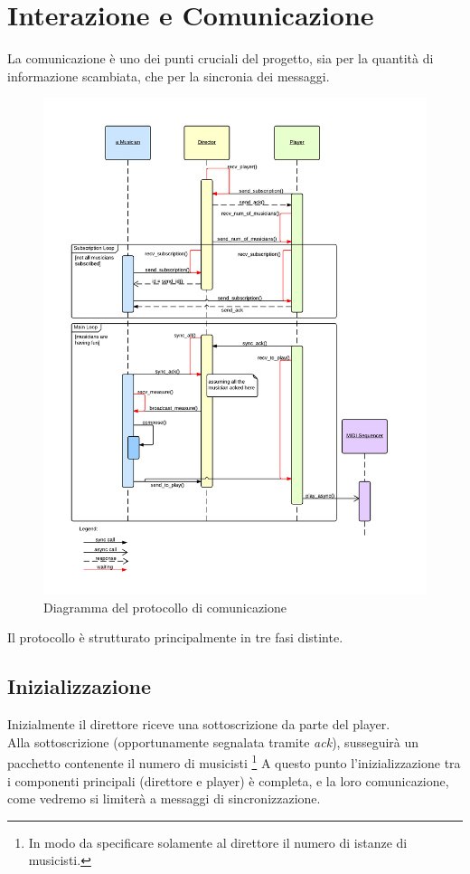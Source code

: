 \section{Interazione e Comunicazione}
La comunicazione è uno dei punti cruciali del progetto,
sia per la quantità di informazione scambiata,
che per la sincronia dei messaggi.

\begin{figure}[H]
\centering
\includegraphics[scale=0.6]{img/protocol.png}
\caption{Diagramma del protocollo di comunicazione}
\end{figure}

Il protocollo è strutturato principalmente in tre fasi distinte.

\subsection{Inizializzazione}
Inizialmente il direttore riceve una sottoscrizione da parte del player.\\
Alla sottoscrizione (opportunamente segnalata tramite \emph{ack}), susseguirà un
pacchetto contenente il numero di musicisti
\footnote{In modo da specificare solamente al direttore
	  il numero di istanze di musicisti.}
A questo punto l'inizializzazione tra i componenti principali
(direttore e player) è completa, e la loro comunicazione, come vedremo
si limiterà a messaggi di sincronizzazione.

